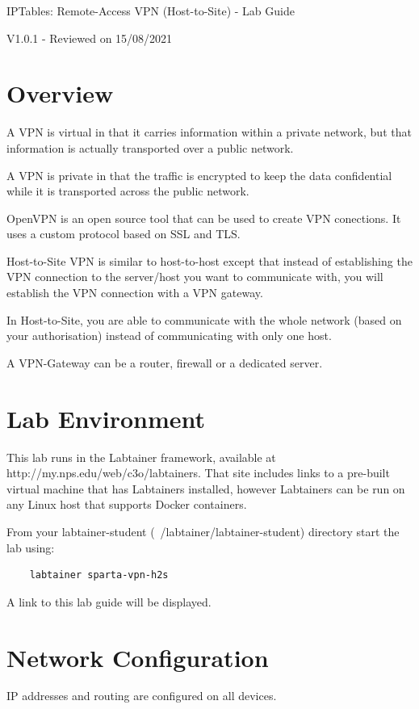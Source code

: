 


\begin{center}
{\LARGE IPTables: Remote-Access VPN (Host-to-Site) - Lab Guide}

V1.0.1 - Reviewed on 15/08/2021
\vspace{0.1in}\\
\end{center}

\copyrightnotice

\section{Overview}
A VPN is virtual in that it carries information within a private network, but that information is actually transported over a public network.

A VPN is private in that the traffic is encrypted to keep the data confidential while it is transported across the public network.

OpenVPN is an open source tool that can be used to create VPN conections. It uses a custom protocol based on SSL and TLS.

Host-to-Site VPN is similar to host-to-host except that instead of establishing the VPN connection to the server/host you want to communicate with, you will establish the VPN connection with a VPN gateway.

In Host-to-Site, you are able to communicate with the whole network (based on your authorisation) instead of communicating with only one host.

A VPN-Gateway can be a router, firewall or a dedicated server.

\section{Lab Environment}
This lab runs in the Labtainer framework,
available at http://my.nps.edu/web/c3o/labtainers.
That site includes links to a pre-built virtual machine
that has Labtainers installed, however Labtainers can
be run on any Linux host that supports Docker containers.

From your labtainer-student (~/labtainer/labtainer-student) directory start the lab using:
\begin{verbatim}
    labtainer sparta-vpn-h2s
\end{verbatim}
\noindent A link to this lab guide will be displayed.

\section{Network Configuration}
IP addresses and routing are configured on all devices.

